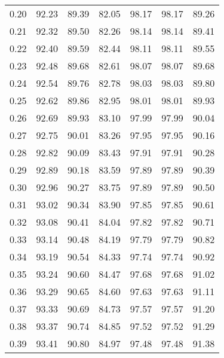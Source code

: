 \begin{tabular}{|c|c|c|c|c|c|c|}
      0.20 &     92.23 &     89.39 &      82.05 &   98.17 &      98.17 &         89.26 \\
      0.21 &     92.32 &     89.50 &      82.26 &   98.14 &      98.14 &         89.41 \\
      0.22 &     92.40 &     89.59 &      82.44 &   98.11 &      98.11 &         89.55 \\
      0.23 &     92.48 &     89.68 &      82.61 &   98.07 &      98.07 &         89.68 \\
      0.24 &     92.54 &     89.76 &      82.78 &   98.03 &      98.03 &         89.80 \\
      0.25 &     92.62 &     89.86 &      82.95 &   98.01 &      98.01 &         89.93 \\
      0.26 &     92.69 &     89.93 &      83.10 &   97.99 &      97.99 &         90.04 \\
      0.27 &     92.75 &     90.01 &      83.26 &   97.95 &      97.95 &         90.16 \\
      0.28 &     92.82 &     90.09 &      83.43 &   97.91 &      97.91 &         90.28 \\
      0.29 &     92.89 &     90.18 &      83.59 &   97.89 &      97.89 &         90.39 \\
      0.30 &     92.96 &     90.27 &      83.75 &   97.89 &      97.89 &         90.50 \\
      0.31 &     93.02 &     90.34 &      83.90 &   97.85 &      97.85 &         90.61 \\
      0.32 &     93.08 &     90.41 &      84.04 &   97.82 &      97.82 &         90.71 \\
      0.33 &     93.14 &     90.48 &      84.19 &   97.79 &      97.79 &         90.82 \\
      0.34 &     93.19 &     90.54 &      84.33 &   97.74 &      97.74 &         90.92 \\
      0.35 &     93.24 &     90.60 &      84.47 &   97.68 &      97.68 &         91.02 \\
      0.36 &     93.29 &     90.65 &      84.60 &   97.63 &      97.63 &         91.11 \\
      0.37 &     93.33 &     90.69 &      84.73 &   97.57 &      97.57 &         91.20 \\
      0.38 &     93.37 &     90.74 &      84.85 &   97.52 &      97.52 &         91.29 \\
      0.39 &     93.41 &     90.80 &      84.97 &   97.48 &      97.48 &         91.38 \\

\end{tabular}

